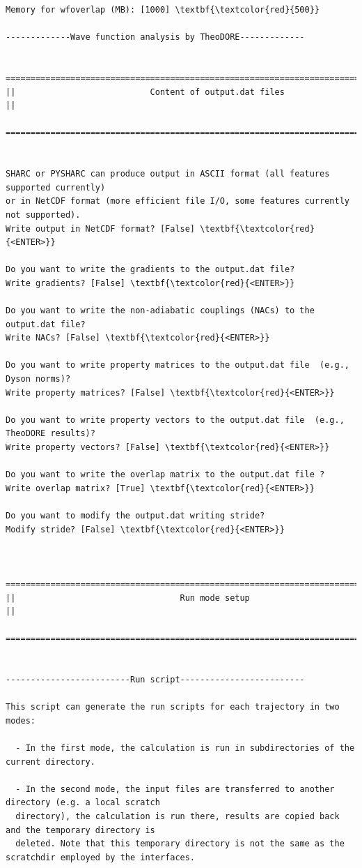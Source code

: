 \documentclass[a4paper,11pt,DIV=15,openany]{scrbook}
\begin{document}
\begin{oframed}
\begin{Verbatim}[commandchars=\\\{\}]
Memory for wfoverlap (MB): [1000] \textbf{\textcolor{red}{500}}

-------------Wave function analysis by TheoDORE-------------

  ================================================================================
||                           Content of output.dat files                          ||
  ================================================================================


SHARC or PYSHARC can produce output in ASCII format (all features supported currently)
or in NetCDF format (more efficient file I/O, some features currently not supported).
Write output in NetCDF format? [False] \textbf{\textcolor{red}{<ENTER>}}

Do you want to write the gradients to the output.dat file?
Write gradients? [False] \textbf{\textcolor{red}{<ENTER>}}

Do you want to write the non-adiabatic couplings (NACs) to the output.dat file?
Write NACs? [False] \textbf{\textcolor{red}{<ENTER>}}

Do you want to write property matrices to the output.dat file  (e.g., Dyson norms)?
Write property matrices? [False] \textbf{\textcolor{red}{<ENTER>}}

Do you want to write property vectors to the output.dat file  (e.g., TheoDORE results)?
Write property vectors? [False] \textbf{\textcolor{red}{<ENTER>}}

Do you want to write the overlap matrix to the output.dat file ?
Write overlap matrix? [True] \textbf{\textcolor{red}{<ENTER>}}

Do you want to modify the output.dat writing stride?
Modify stride? [False] \textbf{\textcolor{red}{<ENTER>}}


  ================================================================================
||                                 Run mode setup                                 ||
  ================================================================================


-------------------------Run script-------------------------

This script can generate the run scripts for each trajectory in two modes:

  - In the first mode, the calculation is run in subdirectories of the current directory.

  - In the second mode, the input files are transferred to another directory (e.g. a local scratch 
  directory), the calculation is run there, results are copied back and the temporary directory is 
  deleted. Note that this temporary directory is not the same as the scratchdir employed by the interfaces.


\end{Verbatim}
\end{oframed}
\end{document}

